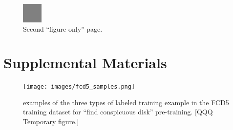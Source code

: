 \documentclass[acmtog]{acmart}
\begin{document}
\begin{figure}
    \includegraphics[width=1cm,height=1.15\linewidth]{images/middle_gray_pixel.png}
    \caption{Second “figure only” page.}
    \label{fig:temp_fo_2}
\end{figure}



\newpage
\onecolumn
\appendix
\section{Supplemental Materials}

\begin{figure}[b]
    \texttt{[image: images/fcd5\_samples.png]}
    \caption{examples of the three types of labeled training example in the FCD5 training dataset for “find conspicuous disk” pre-training.  [QQQ Temporary figure.]}
    \label{fig:fcd5_samples}
\end{figure}
\end{document}
